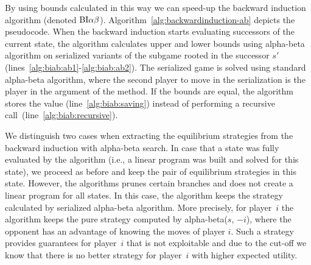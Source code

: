 By using bounds calculated in this way we can speed-up the backward induction algorithm (denoted $\textrm{BI}\alpha\beta$). 
Algorithm~\ref{alg:backwardinduction-ab} depicts the pseudocode.
When the backward induction starts evaluating successors of the current state, the algorithm calculates upper and lower bounds using alpha-beta algorithm on serialized variants of the subgame rooted in the successor $s'$ (lines~\ref{alg:biab:ab1}-\ref{alg:biab:ab2}). 
The serialized game is solved using standard alpha-beta algorithm, where the second player to move in the serialization is the player in the argument of the method.
If the bounds are equal, the algorithm stores the value (line~\ref{alg:biab:saving}) instead of performing a recursive call~(line~\ref{alg:biab:recursive}). 

We distinguish two cases when extracting the equilibrium strategies from the backward induction with alpha-beta search.
In case that a state was fully evaluated by the algorithm (i.e., a linear program was built and solved for this state), we proceed as before and keep the pair of equilibrium strategies in this state.
However, the algorithms prunes certain branches and does not create a linear program for all states.
In this case, the algorithm keeps the strategy calculated by serialized alpha-beta algorithm.
More precisely, for player~$i$ the algorithm keeps the pure strategy computed by alpha-beta($s$, $-i$), where the opponent has an advantage of knowing the moves of player $i$. 
Such a strategy provides guarantees for player~$i$ that is not exploitable and due to the cut-off we know that there is no better strategy for player~$i$ with higher expected utility.

